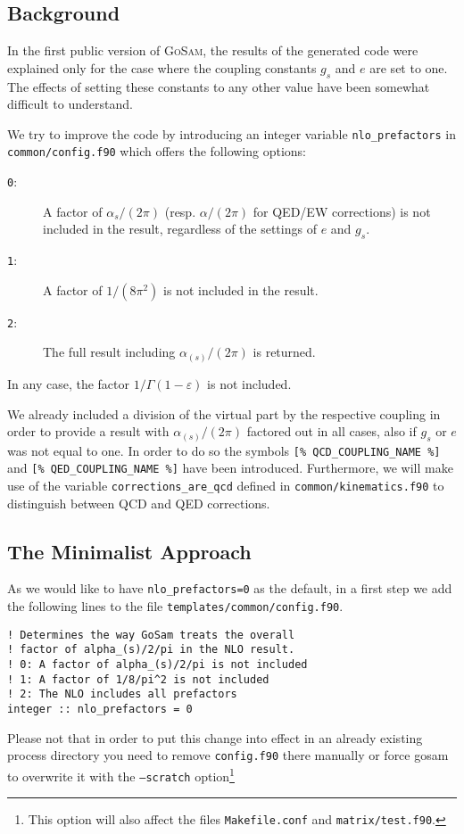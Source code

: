\documentclass[11pt,a4paper]{refrep}
\newcommand{\golem}{\textsc{GoSam}\xspace}
\begin{document}
\subsection{Background}
In the first public version of \golem{}, the results of the generated code
 were explained only for the case where the coupling constants
$g_s$ and $e$ are set to one.
The effects of setting these constants to any other value
have been somewhat difficult to understand.

We try to improve the code by introducing an integer variable
\texttt{nlo\_prefactors} in \texttt{common/config.f90} which
offers the following options:
\begin{description}
\item[\texttt{0}:] A factor of $\alpha_s/(2\pi)$ (resp. $\alpha/(2\pi)$
for QED/EW corrections) is not included in the result, regardless of the
settings of $e$ and $g_s$.
\item[\texttt{1}:] A factor of $1/(8\pi^2)$ is not included in the result.
\item[\texttt{2}:] The full result including $\alpha_{(s)}/(2\pi)$ is
returned.
\end{description}
In any case, the factor $1/\Gamma(1-\varepsilon)$ is not included.

We already included a division of the virtual part by the respective coupling
in order to provide a result with $\alpha_{(s)}/(2\pi)$ factored out in all
cases, also if $g_s$ or $e$ was not equal to one. In order to do so
the symbols \lstinline{[% QCD_COUPLING_NAME %]}
and \lstinline{[% QED_COUPLING_NAME %]}
have been introduced. Furthermore, we will make use of the
variable \texttt{corrections\_are\_qcd} defined in
\texttt{common/kinematics.f90} to distinguish between QCD and QED
corrections.

\subsection{The Minimalist Approach}
\label{ssec:nlo-prefactors:01}
As we would like to have \texttt{nlo\_prefactors=0} as the default,
in a first step we add the following lines to the file
\texttt{templates/\hspace{0pt}common/\hspace{0pt}config.f90}.
\begin{lstlisting}
! Determines the way GoSam treats the overall
! factor of alpha_(s)/2/pi in the NLO result.
! 0: A factor of alpha_(s)/2/pi is not included
! 1: A factor of 1/8/pi^2 is not included
! 2: The NLO includes all prefactors
integer :: nlo_prefactors = 0
\end{lstlisting}
\attention Please not that in order to put this change into effect in an
already existing process directory you need to remove \texttt{config.f90}
there manually or force gosam to overwrite it with the \texttt{--scratch}
option\footnote{This option will also affect the files \texttt{Makefile.conf}
and \texttt{matrix/test.f90}.}
\end{document}
